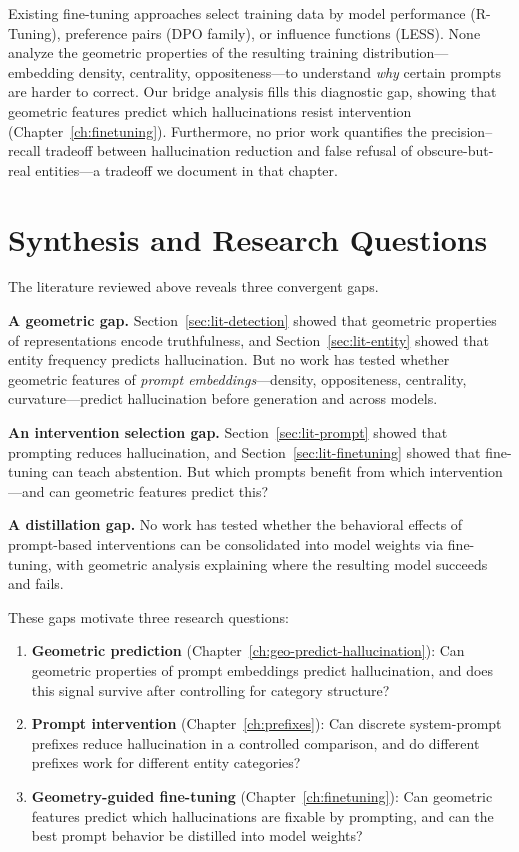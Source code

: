 Existing fine-tuning approaches select training data by model performance (R-Tuning), preference pairs (DPO family), or influence functions (LESS).  None analyze the geometric properties of the resulting training distribution---embedding density, centrality, oppositeness---to understand \emph{why} certain prompts are harder to correct.  Our bridge analysis fills this diagnostic gap, showing that geometric features predict which hallucinations resist intervention (Chapter~\ref{ch:finetuning}).  Furthermore, no prior work quantifies the precision--recall tradeoff between hallucination reduction and false refusal of obscure-but-real entities---a tradeoff we document in that chapter.


\section{Synthesis and Research Questions}
\label{sec:lit-synthesis}

The literature reviewed above reveals three convergent gaps.

\textbf{A geometric gap.}  Section~\ref{sec:lit-detection} showed that geometric properties of representations encode truthfulness, and Section~\ref{sec:lit-entity} showed that entity frequency predicts hallucination.  But no work has tested whether geometric features of \emph{prompt embeddings}---density, oppositeness, centrality, curvature---predict hallucination before generation and across models.

\textbf{An intervention selection gap.}  Section~\ref{sec:lit-prompt} showed that prompting reduces hallucination, and Section~\ref{sec:lit-finetuning} showed that fine-tuning can teach abstention.  But which prompts benefit from which intervention---and can geometric features predict this?

\textbf{A distillation gap.}  No work has tested whether the behavioral effects of prompt-based interventions can be consolidated into model weights via fine-tuning, with geometric analysis explaining where the resulting model succeeds and fails.

These gaps motivate three research questions:

\begin{enumerate}
    \item \textbf{Geometric prediction} (Chapter~\ref{ch:geo-predict-hallucination}): Can geometric properties of prompt embeddings predict hallucination, and does this signal survive after controlling for category structure?

    \item \textbf{Prompt intervention} (Chapter~\ref{ch:prefixes}): Can discrete system-prompt prefixes reduce hallucination in a controlled comparison, and do different prefixes work for different entity categories?

    \item \textbf{Geometry-guided fine-tuning} (Chapter~\ref{ch:finetuning}): Can geometric features predict which hallucinations are fixable by prompting, and can the best prompt behavior be distilled into model weights?
\end{enumerate}

